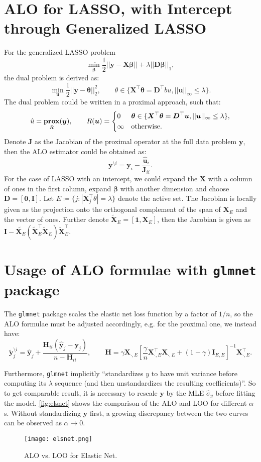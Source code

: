 \documentclass[11pt]{article}
\newcommand{\bu}{\bm{u}}
\newcommand{\by}{\bm{y}}
\newcommand{\bD}{\bm{D}}
\newcommand{\bH}{\bm{H}}
\newcommand{\bI}{\bm{I}}
\newcommand{\bJ}{\bm{J}}
\newcommand{\bX}{\bm{X}}
\newcommand{\bbeta}{\bm{\beta}}
\newcommand{\btheta}{\bm{\theta}}
\DeclareMathOperator{\bprox}{\mathbf{prox}}
\begin{document}
\section{ALO for LASSO, with Intercept through Generalized LASSO}
For the generalized LASSO problem \[\min\limits_{\bbeta}\frac{1}{2}||\by-\bX\bbeta||+\lambda||\bD\bbeta||_{1},\] the dual problem is derived as: \[\min\limits_{\bu}\frac{1}{2}||\by-\btheta||_{2}^{2},\qquad\theta\in \{\bX^{\top}\btheta = \bD^{\top}bu, ||\bu||_{\infty} \leq \lambda\}.\] The dual problem could be written in a proximal approach, such that: \[\hat{u} = \bprox_{R}(\by),\qquad R(\bu) =\begin{dcases}
0 & \btheta \in \{\bX^{\top}\btheta = \bD^{\top}\bu, ||\bu||_{\infty} \leq \lambda\},\\
\infty & \text{otherwise.}
\end{dcases}\] Denote $\bJ$ as the Jacobian of the proximal operator at the full data problem $\by$, then the ALO estimator could be obtained as: \[\by^{\setminus i} = \by_{i} - \frac{\hat{\bu}_{i}}{\bJ_{ii}}.\] For the case of LASSO with an intercept, we could expand the $\bX$ with a column of ones in the first column, expand $\bbeta$ with another dimension and choose $\bD = [\bm{0}, \bI]$. Let \(E\coloneqq\{j:|\bX_{j}^{\top}\theta| = \lambda \}\) denote the active set. The Jacobian is locally given as the projection onto the orthogonal complement of the span of $\bX_{E}$ and the vector of ones. Further denote $\tilde{\bX}_{E} = [\textbf{1}, \bX_{E}]$, then the Jacobian is given as $\bI - \tilde{\bX_{E}}(\tilde{\bX}_{E}^{\top}\tilde{\bX}_{E})\tilde{\bX}_{E}^{\top}$.

\section{Usage of ALO formulae with \texttt{glmnet} package}
The \verb|glmnet| package scales the elastic net loss function by a factor of \(1/n\), so the ALO formulae must be adjusted accordingly, e.g. for the proximal one, we instead have: \[\tilde{\by}_j^{\setminus i}=\hat{\by}_j+\frac{\bH_{ii}(\hat{\by}_j-\by_j)}{n-\bH_{ii}},\qquad\bH=\gamma\bX_{\cdot,E}\left[\frac{\gamma}{n}\bX_{\cdot,E}^\top\bX_{\cdot,E}+\left(1-\gamma\right)\bI_{E,E}\right]^{-1}\bX_{\cdot,E}^\top.\]

Furthermore, \verb|glmnet| implicitly ``standardizes \(y\) to have unit variance before computing its \(\lambda\) sequence (and then unstandardizes the resulting coefficients)''. So to get comparable result, it is necessary to rescale \(\by\) by the MLE \(\hat{\sigma}_y\) before fitting the model. \autoref{fig:elsnet} shows the comparison of the ALO and LOO for different \(\alpha\)s. Without standardizing \(\by\) first, a growing discrepancy between the two curves can be observed as \(\alpha\to0\).
	\begin{figure}[!htbp]
		\centering
		\texttt{[image: elsnet.png]}
		\caption{ALO vs. LOO for Elastic Net. \label{fig:elsnet}}
	\end{figure}
\end{document}
